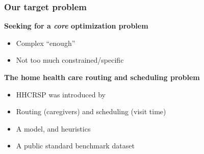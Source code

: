 \documentclass{beamer}
\begin{document}
\begin{frame}
   \frametitle{Our target problem}

   \textbf{Seeking for a \emph{core} optimization problem}
   \begin{itemize}
      \item Complex ``enough''
      \item Not too much constrained/specific
   \end{itemize}

   \vspace*{12pt}

   \textbf{The home health care routing and scheduling problem}
   \begin{itemize}
      \item HHCRSP was introduced by \citet{mankowska2014}
      \item Routing (caregivers) and scheduling (visit time)
      \item A model, and heuristics
      \item A public standard benchmark dataset
   \end{itemize}



\end{frame}


\end{document}
